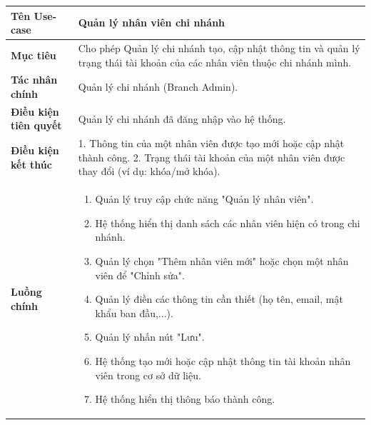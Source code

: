 
\begin{table}[H]
\centering
\renewcommand{\arraystretch}{1.3}
\begin{tabular}{|p{4cm}|p{10cm}|}
\hline
\textbf{Tên Use-case} 
& Quản lý nhân viên chi nhánh \\ 
\hline

\textbf{Mục tiêu} 
& Cho phép Quản lý chi nhánh tạo, cập nhật thông tin và quản lý trạng thái tài khoản của các nhân viên thuộc chi nhánh mình. \\ 
\hline

\textbf{Tác nhân chính} 
& Quản lý chi nhánh (Branch Admin). \\ 
\hline

\textbf{Điều kiện tiên quyết} 
& Quản lý chi nhánh đã đăng nhập vào hệ thống. \\ 
\hline

\textbf{Điều kiện kết thúc} 
& 
1. Thông tin của một nhân viên được tạo mới hoặc cập nhật thành công.
2. Trạng thái tài khoản của một nhân viên được thay đổi (ví dụ: khóa/mở khóa).
\\ 
\hline

\textbf{Luồng chính} 
& 
\begin{enumerate}
    \item Quản lý truy cập chức năng "Quản lý nhân viên".
    \item Hệ thống hiển thị danh sách các nhân viên hiện có trong chi nhánh.
    \item Quản lý chọn "Thêm nhân viên mới" hoặc chọn một nhân viên để "Chỉnh sửa".
    \item Quản lý điền các thông tin cần thiết (họ tên, email, mật khẩu ban đầu,...).
    \item Quản lý nhấn nút "Lưu".
    \item Hệ thống tạo mới hoặc cập nhật thông tin tài khoản nhân viên trong cơ sở dữ liệu.
    \item Hệ thống hiển thị thông báo thành công.
\end{enumerate} \\ 
\hline


\end{tabular}
\end{table}
